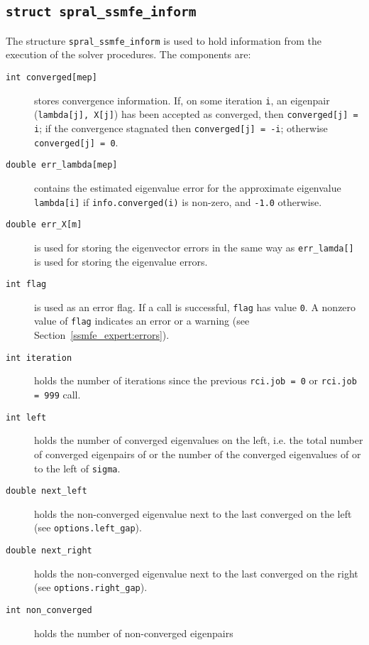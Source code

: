 \subsection{\texttt{struct spral\_ssmfe\_inform}}

\label{ssmfe_expert:type:inform}

The structure {\tt spral\_ssmfe\_inform} is used
to hold information from the execution of
the solver procedures.
The components are:

\begin{description}
%
\item[\texttt{int converged[mep]}] stores convergence information.
If, on some iteration {\tt i}, an eigenpair ({\tt lambda[j], X[j]})
has been accepted as converged,
then {\tt converged[j] = i}; if the convergence stagnated
then {\tt converged[j] = -i}; otherwise {\tt converged[j] = 0}.
%
\item[\texttt{double err\_lambda[mep]}] contains 
the estimated eigenvalue error
for the approximate eigenvalue {\tt lambda[i]}
if {\tt info.converged(i)} is non-zero,
and {\tt -1.0} otherwise.
%
\item[\texttt{double err\_X[m]}] is used for storing the eigenvector errors
in the same way as {\tt err\_lamda[]} is used
for storing the eigenvalue errors.
%
\item[\texttt{int flag}] is used as an error flag.
If a call is successful, {\tt flag} has value {\tt 0}.
A nonzero value of {\tt flag} indicates an error or a warning
(see Section~\ref{ssmfe_expert:errors}).
%
\item[\texttt{int iteration}] holds the number of iterations 
since the previous {\tt rci.job = 0} or {\tt rci.job = 999} call.
%
\item[\texttt{int left}] holds the number of converged eigenvalues on the left,
i.e. the total number of converged eigenpairs of 
or the number of the converged eigenvalues 
of  or 
to the left of {\tt sigma}. 
%
\item[\texttt{double next\_left}] holds
the non-converged eigenvalue next to the last converged on the left\\
(see {\tt options.left\_gap}).
%
\item[\texttt{double next\_right}] holds
the non-converged eigenvalue next to the last converged on the right\\
(see {\tt options.right\_gap}).
%
\item[\texttt{int non\_converged}] holds the number of non-converged eigenpairs

\end{description}
